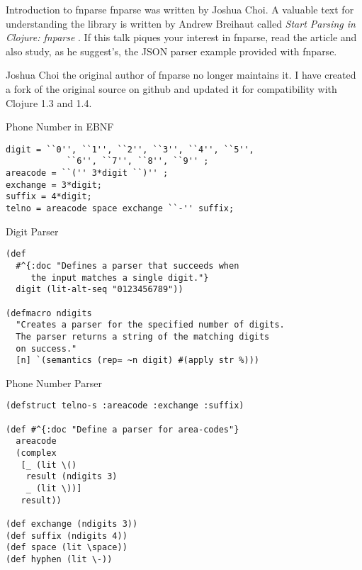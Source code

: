 \documentclass[presentation]{beamer}
\begin{document}
\begin{frame}{Introduction to fnparse}
  fnparse \cite{Choi} was written by Joshua Choi. A valuable text for
  understanding the library is written by Andrew Breihaut called
  \emph{Start Parsing in Clojure: fnparse} \cite{Breihaut}.  If this
  talk piques your interest in fnparse, read the article and also
  study, as he suggest's, the JSON parser example provided with
  fnparse.

  Joshua Choi the original author of fnparse no longer maintains it. I
  have created a fork of the original source on github and updated it
  for compatibility with Clojure 1.3 and 1.4.
\end{frame}

%
%
\begin{frame}[fragile]{Phone Number in \ac{EBNF}}
\begin{verbatim}
digit = ``0'', ``1'', ``2'', ``3'', ``4'', ``5'',
            ``6'', ``7'', ``8'', ``9'' ;
areacode = ``('' 3*digit ``)'' ;
exchange = 3*digit;
suffix = 4*digit;
telno = areacode space exchange ``-'' suffix;
\end{verbatim}
\end{frame}

\begin{frame}[fragile]{Digit Parser}
\begin{verbatim}
(def
  #^{:doc "Defines a parser that succeeds when
     the input matches a single digit."}
  digit (lit-alt-seq "0123456789"))

(defmacro ndigits
  "Creates a parser for the specified number of digits.
  The parser returns a string of the matching digits
  on success."
  [n] `(semantics (rep= ~n digit) #(apply str %)))
\end{verbatim}
\end{frame}

\begin{frame}[fragile]{Phone Number Parser}
\begin{verbatim}
(defstruct telno-s :areacode :exchange :suffix)

(def #^{:doc "Define a parser for area-codes"}
  areacode
  (complex
   [_ (lit \()
    result (ndigits 3)
    _ (lit \))]
   result))

(def exchange (ndigits 3))
(def suffix (ndigits 4))
(def space (lit \space))
(def hyphen (lit \-))

\end{verbatim}
\end{frame}
\end{document}
